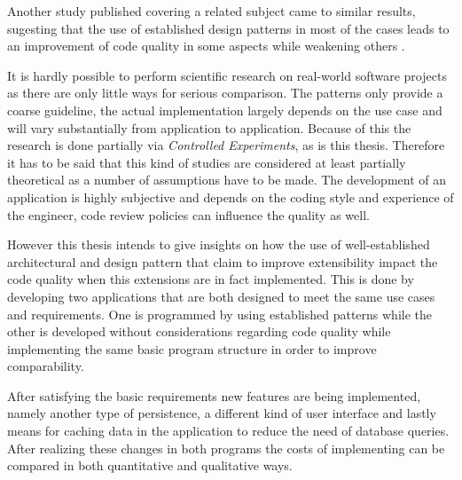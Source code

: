 Another study published covering a related subject came to similar results, sugesting that the use of established design patterns in most of the cases leads to an improvement of code quality in some aspects while weakening others \cite{quality2}.

It is hardly possible to perform scientific research on real-world software projects as there are only little ways for serious comparison. The patterns only provide a coarse guideline, the actual implementation largely depends on the use case and will vary substantially from application to application. Because of this the research is done partially via \emph{Controlled Experiments}, as is this thesis. Therefore it has to be said that this kind of studies are considered at least partially theoretical as a number of assumptions have to be made. The development of an application is highly subjective and depends on the coding style and experience of the engineer, code review policies can influence the quality as well.

However this thesis intends to give insights on how the use of well-established architectural and design pattern that claim to improve extensibility impact the code quality when this extensions are in fact implemented. This is done by developing two applications that are both designed to meet the same use cases and requirements. One is programmed by using established patterns while the other is developed without considerations regarding code quality while  implementing the same basic program structure in order to improve comparability.

After satisfying the basic requirements new features are being implemented, namely another type of persistence, a different kind of user interface and lastly means for caching data in the application to reduce the need of database queries. After realizing these changes in both programs the costs of implementing can be compared in both quantitative and qualitative ways. 

